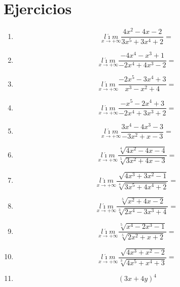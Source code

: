\documentclass[oneside,spanish,letter]{article}
\begin{document}
\section{Ejercicios}
\begin{enumerate}
 \item $$\underset{x\rightarrow +\infty}{l\acute{\imath}m} \frac{4x^2-4x-2}{3x^5+3x^4+2}=$$
 \item $$\underset{x\rightarrow +\infty}{l\acute{\imath}m} \frac{-4x^4-x^3+1}{-2x^4+4x^3-2}=$$
 \item $$\underset{x\rightarrow +\infty}{l\acute{\imath}m} \frac{-2x^5-3x^4+3}{x^3-x^2+4}=$$
 \item $$\underset{x\rightarrow +\infty}{l\acute{\imath}m} \frac{-x^5-2x^4+3}{-2x^4+3x^3+2}=$$
 \item $$\underset{x\rightarrow +\infty}{l\acute{\imath}m} \frac{3x^4-4x^3-3}{-3x^2+x-3}=$$
 \item $$\underset{x\rightarrow +\infty}{l\acute{\imath}m} \frac{\sqrt[4]{4x^2-4x-4}}{\sqrt[5]{3x^2+4x-3}}=$$
 \item $$\underset{x\rightarrow +\infty}{l\acute{\imath}m} \frac{\sqrt[]{4x^3+3x^2-1}}{\sqrt[4]{3x^5+4x^4+2}}=$$
 \item $$\underset{x\rightarrow +\infty}{l\acute{\imath}m} \frac{\sqrt[5]{x^2+4x-2}}{\sqrt[3]{2x^4-3x^3+4}}=$$
 \item $$\underset{x\rightarrow +\infty}{l\acute{\imath}m} \frac{\sqrt[5]{x^4-2x^3-1}}{\sqrt[5]{2x^2+x+2}}=$$
 \item $$\underset{x\rightarrow +\infty}{l\acute{\imath}m} \frac{\sqrt[]{4x^3+x^2-2}}{\sqrt[3]{4x^5+x^4+3}}=$$
\item $$(3x+4y)^4$$
 \end{enumerate}
  \newpage
\end{document}
